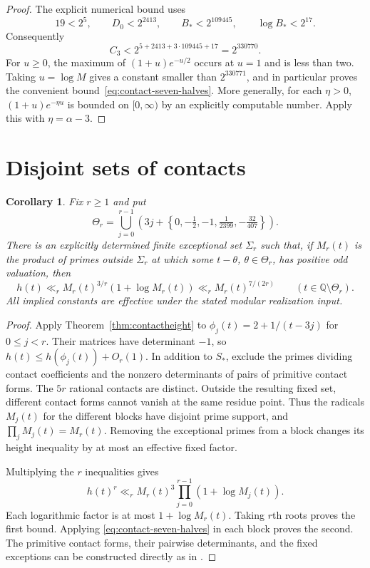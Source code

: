 \documentclass[11pt,a4paper]{article}
\newtheorem{corollary}[theorem]{Corollary}
\theoremstyle{definition}
\newcommand{\Q}{\mathbb Q}
\begin{document}
\begin{proof}
The explicit numerical bound uses
\[
 19<2^5,\qquad D_0<2^{2413},\qquad
 B_*<2^{109445},\qquad \log B_*<2^{17}.
\]
Consequently
\[
 C_3<2^{5+2413+3\cdot109445+17}=2^{330770}.
\]
For $u\ge0$, the maximum of $(1+u)e^{-u/2}$ occurs at
$u=1$ and is less than two. Taking $u=\log M$ gives a
constant smaller than $2^{330771}$, and in particular proves
the convenient bound~\eqref{eq:contact-seven-halves}.
More generally, for each $\eta>0$,
$(1+u)e^{-\eta u}$ is bounded on $[0,\infty)$ by an explicitly
computable number. Apply this with $\eta=\alpha-3$.
\end{proof}

\section{Disjoint sets of contacts}

\begin{corollary}\label{cor:amplification}
Fix $r\ge1$ and put
\[
 \Theta_r=\bigcup_{j=0}^{r-1}
 \left(3j+\left\{0,-\tfrac12,-1,
                     \tfrac1{2399},-\tfrac{32}{407}\right\}\right).
\]
There is an explicitly determined finite exceptional set $\Sigma_r$
such that, if $M_r(t)$ is the product of primes outside $\Sigma_r$
at which some $t-\theta$, $\theta\in\Theta_r$, has positive odd
valuation, then
\[
 h(t)\ll_r M_r(t)^{3/r}(1+\log M_r(t))
       \ll_r M_r(t)^{7/(2r)}
       \qquad(t\in\Q\setminus\Theta_r).
\]
All implied constants are effective under the stated modular
realization input.
\end{corollary}
\begin{proof}
Apply Theorem~\ref{thm:contactheight} to
$\phi_j(t)=2+1/(t-3j)$ for $0\le j<r$.
Their matrices have determinant $-1$, so
$h(t)\le h(\phi_j(t))+O_r(1)$.
In addition to $S_*$, exclude the primes dividing contact
coefficients and the nonzero determinants of pairs of primitive
contact forms. The $5r$ rational contacts are distinct.
Outside the resulting fixed set, different contact forms cannot
vanish at the same residue point. Thus the radicals $M_j(t)$
for the different blocks have disjoint prime support, and
$\prod_jM_j(t)=M_r(t)$. Removing the exceptional primes from
a block changes its height inequality by at most an effective
fixed factor.

Multiplying the $r$ inequalities gives
\[
 h(t)^r\ll_r M_r(t)^3
                  \prod_{j=0}^{r-1}(1+\log M_j(t)).
\]
Each logarithmic factor is at most $1+\log M_r(t)$.
Taking $r$th roots proves the first bound. Applying
\eqref{eq:contact-seven-halves} in each block proves the second.
The primitive contact forms, their pairwise determinants, and the
fixed exceptions can be constructed directly as in
\cite[Sections~1--2]{Amplification}.
\end{proof}
\end{document}
